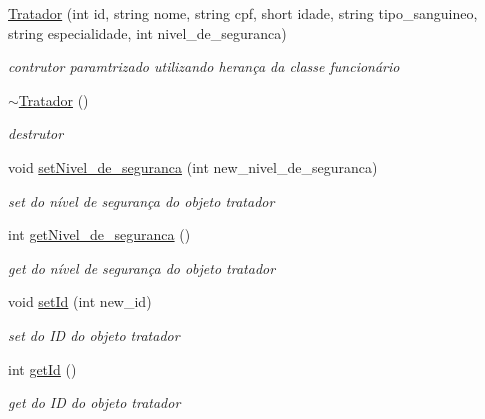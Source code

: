 \begin{DoxyCompactItemize}
\item 
\mbox{\label{class_tratador_a7f07d85cddf8bdab29f63c23bd560082}} 
\mbox{\hyperlink{class_tratador_a7f07d85cddf8bdab29f63c23bd560082}{Tratador}} (int id, string nome, string cpf, short idade, string tipo\+\_\+sanguineo, string especialidade, int nivel\+\_\+de\+\_\+seguranca)
\begin{DoxyCompactList}\small\item\em contrutor paramtrizado utilizando herança da classe funcionário \end{DoxyCompactList}\item 
\mbox{\label{class_tratador_a8750ed6960e786da5d6f87e05b491093}} 
\mbox{\hyperlink{class_tratador_a8750ed6960e786da5d6f87e05b491093}{$\sim$\+Tratador}} ()
\begin{DoxyCompactList}\small\item\em destrutor \end{DoxyCompactList}\item 
void \mbox{\hyperlink{class_tratador_a21f76262c8abf9c4e4a73b8a19a4527c}{set\+Nivel\+\_\+de\+\_\+seguranca}} (int new\+\_\+nivel\+\_\+de\+\_\+seguranca)
\begin{DoxyCompactList}\small\item\em set do nível de segurança do objeto tratador \end{DoxyCompactList}\item 
int \mbox{\hyperlink{class_tratador_ae2233b1cf850e3e3e183f1a934b410a6}{get\+Nivel\+\_\+de\+\_\+seguranca}} ()
\begin{DoxyCompactList}\small\item\em get do nível de segurança do objeto tratador \end{DoxyCompactList}\item 
void \mbox{\hyperlink{class_tratador_a6546aab57e697193f8593d9682c95c0c}{set\+Id}} (int new\+\_\+id)
\begin{DoxyCompactList}\small\item\em set do ID do objeto tratador \end{DoxyCompactList}\item 
int \mbox{\hyperlink{class_tratador_a3f35d05a4ebaa992c473e88cda95e47a}{get\+Id}} ()
\begin{DoxyCompactList}\small\item\em get do ID do objeto tratador \end{DoxyCompactList}\item 

\end{DoxyCompactItemize}
